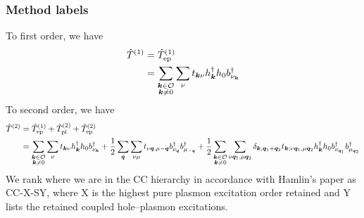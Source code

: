 \subsubsection{Method labels}
To first order, we have \begin{align}
    \hat{T}^{(1)}
    &=
    \hat{T}_{\rm ep}^{(1)}\\
&=    \sum_{\substack{\bm{k}\in\mathcal{O}\\ \bm{k}\neq 0}}
    \sum_{\nu}
    t_{\bm{k}\nu}
    h_{\bm{k}}^{\dagger}
    h_0
    b_{\nu_{\bm{k}}}^{\dagger}
\end{align}
To second order, we have 
\begin{align}
    \hat{T}^{(2)}
    &=
    \hat{T}_{\rm ep}^{(1)}
    +
    \hat{T}_{\rm pl}^{(2)}
    +
    \hat{T}_{\rm ep}^{(2)}\\
&=\sum_{\substack{\bm{k}\in\mathcal{O}\\ \bm{k}\neq 0}}
    \sum_{\nu}
    t_{\bm{k}\nu}
    h_{\bm{k}}^{\dagger}
    h_0
    b_{\nu_{\bm{k}}}^{\dagger}
+     \frac{1}{2}
    \sum_{\bm{q}}
    \sum_{\nu\mu}
    t_{\nu\bm{q},\mu-\bm{q}}
    b_{\nu_{\bm{q}}}^{\dagger}
    b_{\mu_{-\bm{q}}}^{\dagger}+     \frac{1}{2}
    \sum_{\substack{\bm{k}\in\mathcal{O}\\ \bm{k}\neq0}}
    \sum_{\nu\bm{q}_1,\mu\bm{q}_2}
    \delta_{\bm{k},\bm{q}_1+\bm{q}_2}
    t_{\bm{k};\nu\bm{q}_1,\mu\bm{q}_2}
    h_{\bm{k}}^{\dagger}
    h_0
    b_{\nu_{\bm{q}_1}}^{\dagger}
    b_{\mu_{\bm{q}_2}}^{\dagger}
    \label{eq:T2}
\end{align}
We rank where we are in the CC hierarchy in accordance with Hamlin's paper as CC-X-SY, where X is the highest pure plasmon excitation order retained and Y lists the retained coupled hole--plasmon excitations.
